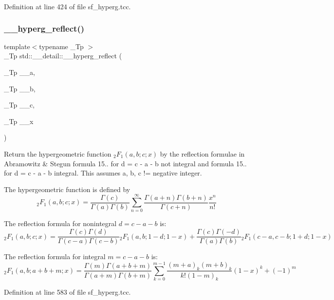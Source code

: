 Definition at line 424 of file sf\+\_\+hyperg.\+tcc.

\mbox{\label{namespacestd_1_1____detail_a3c3baddc93bfaf1cb368d4b74e53542d}} 
\subsubsection{\texorpdfstring{\+\_\+\+\_\+hyperg\+\_\+reflect()}{\_\_hyperg\_reflect()}}
{\footnotesize\ttfamily template$<$typename \+\_\+\+Tp $>$ \\
\+\_\+\+Tp std\+::\+\_\+\+\_\+detail\+::\+\_\+\+\_\+hyperg\+\_\+reflect (\begin{DoxyParamCaption}\item[{\+\_\+\+Tp}]{\+\_\+\+\_\+a,  }\item[{\+\_\+\+Tp}]{\+\_\+\+\_\+b,  }\item[{\+\_\+\+Tp}]{\+\_\+\+\_\+c,  }\item[{\+\_\+\+Tp}]{\+\_\+\+\_\+x }\end{DoxyParamCaption})}



Return the hypergeometric function $ {}_2F_1(a,b;c;x) $ by the reflection formulae in Abramowitz \& Stegun formula 15.. for d = c -\/ a -\/ b not integral and formula 15.. for d = c -\/ a -\/ b integral. This assumes a, b, c != negative integer. 

The hypergeometric function is defined by \[ {}_2F_1(a,b;c;x) = \frac{\Gamma(c)}{\Gamma(a)\Gamma(b)} \sum_{n=0}^{\infty} \frac{\Gamma(a+n)\Gamma(b+n)}{\Gamma(c+n)} \frac{x^n}{n!} \]

The reflection formula for nonintegral $ d = c - a - b $ is\+: \[ {}_2F_1(a,b;c;x) = \frac{\Gamma(c)\Gamma(d)}{\Gamma(c-a)\Gamma(c-b)} {}_2F_1(a,b;1-d;1-x) + \frac{\Gamma(c)\Gamma(-d)}{\Gamma(a)\Gamma(b)} {}_2F_1(c-a,c-b;1+d;1-x) \]

The reflection formula for integral $ m = c - a - b $ is\+: \[ {}_2F_1(a,b;a+b+m;x) = \frac{\Gamma(m)\Gamma(a+b+m)}{\Gamma(a+m)\Gamma(b+m)} \sum_{k=0}^{m-1} \frac{(m+a)_k(m+b)_k}{k!(1-m)_k} (1 - x)^k + (-1)^m \] 

Definition at line 583 of file sf\+\_\+hyperg.\+tcc.



